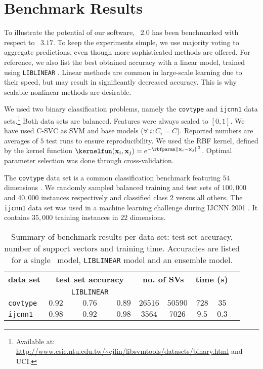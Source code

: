 \section{Benchmark Results} \label{bench}
To illustrate the potential of our software, \esvm\ $2.0$ has been benchmarked with respect to \libsvm\
$3.17$. To keep the experiments simple, we use majority voting to aggregate predictions, even though more sophisticated methods are offered. For reference, we also list the best obtained accuracy with a linear model, trained using \texttt{LIBLINEAR} \citep{Fan:2008:LLL:1390681.1442794}. Linear methods are common in large-scale learning due to their speed, but may result in significantly decreased accuracy. This is why scalable nonlinear methods are desirable.

We used two binary classification problems, namely the {\tt covtype} and {\tt ijcnn1} data sets.\footnote{Available
at: \url{http://www.csie.ntu.edu.tw/~cjlin/libsvmtools/datasets/binary.html}
and UCI.} Both data sets are balanced. Features were always scaled to $[0,1]$. We have
used C-SVC as SVM and base models ($\forall\ i: C_i=C$). Reported numbers are averages of $5$ test runs to ensure reproducibility. We used the RBF kernel, defined by the kernel function
$\kernelfun(\mathbf{x}_i,\mathbf{x}_j)=e^{-\rbfparam ||\mathbf{x}_i-\mathbf{x}_j||^2}$.
Optimal parameter selection was done through cross-validation.

The \texttt{covtype} data set is a common classification benchmark featuring
$54$ dimensions \citep{Blackard00covtype}. We randomly sampled balanced training
and test sets of $100,000$ and $40,000$ instances respectively and classified class $2$ versus all others. The \texttt{ijcnn1} data set was used in a machine learning challenge during IJCNN 2001 \citep{prokhorov2001ijcnn}. It contains $35,000$ training instances in $22$ dimensions.

\addtolength{\partopsep}{-5mm}
\begin{table}[!h]
\centering
\begin{tabular}{lcccccccc}
\toprule 
{\bfseries data set} & \multicolumn{3}{c}{\bfseries test set accuracy} & 
\multicolumn{2}{c}{\bfseries no. of SVs} & \multicolumn{2}{c}{\bfseries time
(s)}
\\
 & \libsvm & \texttt{LIBLINEAR} & \esvmshort & \libsvm & \esvmshort & \libsvm
 & \esvmshort \\
\midrule 
{\tt covtype} & $0.92$ & $0.76$ & $0.89$ & $26516$ & $50590$ & $728$ & $35$ \\
{\tt ijcnn1} & $0.98$ & $0.92$ & $0.98$ & $3564$ & $7026$ & $9.5$ & $0.3$ \\
\bottomrule
\end{tabular}
\caption{Summary of benchmark results per data set: test set accuracy, number of
support vectors and training time. Accuracies are listed for a single \libsvm\ model, \texttt{LIBLINEAR} model and an ensemble model.}
\label{resultstable}
\end{table}
\addtolength{\partopsep}{5mm}

